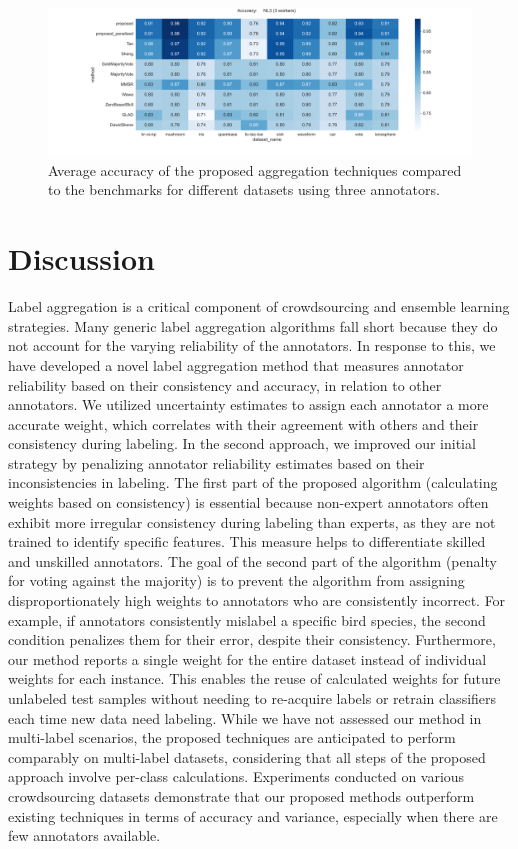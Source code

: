 \documentclass[pdflatex,bst/sn-basic]{bst/sn-jnl}%
\begin{document}
\begin{figure}[!htbp]
    \centering \includegraphics[width=\textwidth]{figures/image10.png}
    \caption{Average accuracy of the proposed aggregation techniques compared to the benchmarks for different datasets using three annotators.}
    \label{Fig.7-accuracy-different-datasets}
\end{figure}



\section{Discussion}
Label aggregation is a critical component of crowdsourcing and ensemble learning strategies. Many generic label aggregation algorithms fall short because they do not account for the varying reliability of the annotators. In response to this, we have developed a novel label aggregation method that measures annotator reliability based on their consistency and accuracy, in relation to other annotators. We utilized uncertainty estimates to assign each annotator a more accurate weight, which correlates with their agreement with others and their consistency during labeling. In the second approach, we improved our initial strategy by penalizing annotator reliability estimates based on their inconsistencies in labeling.
The first part of the proposed algorithm (calculating weights based on consistency) is essential because non-expert annotators often exhibit more irregular consistency during labeling than experts, as they are not trained to identify specific features. This measure helps to differentiate skilled and unskilled annotators. The goal of the second part of the algorithm (penalty for voting against the majority) is to prevent the algorithm from assigning disproportionately high weights to annotators who are consistently incorrect. For example, if annotators consistently mislabel a specific bird species, the second condition penalizes them for their error, despite their consistency.
Furthermore, our method reports a single weight for the entire dataset instead of individual weights for each instance. This enables the reuse of calculated weights for future unlabeled test samples without needing to re-acquire labels or retrain classifiers each time new data need labeling. While we have not assessed our method in multi-label scenarios, the proposed techniques are anticipated to perform comparably on multi-label datasets, considering that all steps of the proposed approach involve per-class calculations. Experiments conducted on various crowdsourcing datasets demonstrate that our proposed methods outperform existing techniques in terms of accuracy and variance, especially when there are few annotators available.
\end{document}
